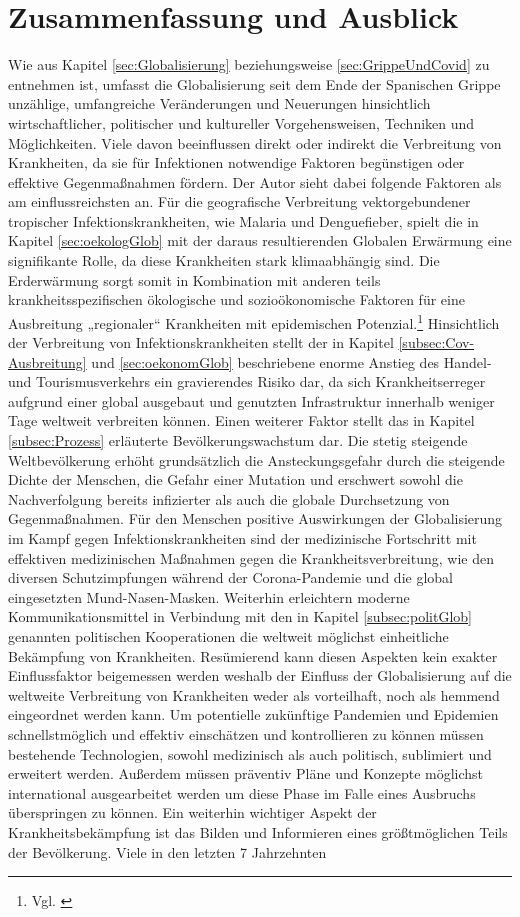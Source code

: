 \documentclass[12pt]{article}
\begin{document}
\section{Zusammenfassung und Ausblick}
Wie aus Kapitel \ref{sec:Globalisierung} beziehungsweise \ref{sec:GrippeUndCovid} zu entnehmen ist, umfasst die Globalisierung seit dem Ende der Spanischen Grippe unzählige, umfangreiche Veränderungen und Neuerungen hinsichtlich wirtschaftlicher, politischer und kultureller Vorgehensweisen, Techniken und Möglichkeiten. Viele davon beeinflussen direkt oder indirekt die Verbreitung von Krankheiten, da sie für Infektionen notwendige Faktoren begünstigen oder effektive Gegenmaßnahmen fördern. Der Autor sieht dabei folgende Faktoren als am einflussreichsten an. Für die geografische Verbreitung vektorgebundener tropischer Infektionskrankheiten, wie Malaria und Denguefieber, spielt die in Kapitel \ref{sec:oekologGlob} mit der daraus resultierenden Globalen Erwärmung eine signifikante Rolle, da diese Krankheiten stark klimaabhängig sind. Die Erderwärmung sorgt somit in Kombination mit anderen teils krankheitsspezifischen ökologische und sozioökonomische Faktoren für eine Ausbreitung „regionaler“ Krankheiten mit epidemischen Potenzial.\footnote{Vgl. \cite{Ebert2005}} Hinsichtlich der Verbreitung von Infektionskrankheiten stellt der in Kapitel \ref{subsec:Cov-Ausbreitung} und \ref{sec:oekonomGlob} beschriebene enorme Anstieg des Handel- und Tourismusverkehrs ein gravierendes Risiko dar, da sich Krankheitserreger aufgrund einer global ausgebaut und genutzten Infrastruktur innerhalb weniger Tage weltweit verbreiten können. Einen weiterer Faktor stellt das in Kapitel \ref{subsec:Prozess} erläuterte Bevölkerungswachstum dar. Die stetig steigende Weltbevölkerung erhöht grundsätzlich die Ansteckungsgefahr durch die steigende Dichte der Menschen, die Gefahr einer Mutation und erschwert sowohl die Nachverfolgung bereits infizierter als auch die globale Durchsetzung von Gegenmaßnahmen. Für den Menschen positive Auswirkungen der Globalisierung im Kampf gegen Infektionskrankheiten sind der medizinische Fortschritt mit effektiven medizinischen Maßnahmen gegen die Krankheitsverbreitung, wie den diversen Schutzimpfungen während der Corona-Pandemie und die global eingesetzten Mund-Nasen-Masken. Weiterhin erleichtern moderne Kommunikationsmittel in Verbindung mit den in Kapitel \ref{subsec:politGlob} genannten politischen Kooperationen die weltweit möglichst einheitliche Bekämpfung von Krankheiten. Resümierend kann diesen Aspekten kein exakter Einflussfaktor beigemessen werden weshalb der Einfluss der Globalisierung auf die weltweite Verbreitung von Krankheiten weder als vorteilhaft, noch als hemmend eingeordnet werden kann. Um potentielle zukünftige Pandemien und Epidemien schnellstmöglich und effektiv einschätzen und kontrollieren zu können müssen bestehende Technologien, sowohl medizinisch als auch politisch, sublimiert und erweitert werden. Außerdem müssen präventiv Pläne und Konzepte möglichst international ausgearbeitet werden um diese Phase im Falle eines Ausbruchs überspringen zu können. Ein weiterhin wichtiger Aspekt der Krankheitsbekämpfung ist das Bilden und Informieren eines größtmöglichen Teils der Bevölkerung. Viele in den letzten 7 Jahrzehnten 
\end{document}

